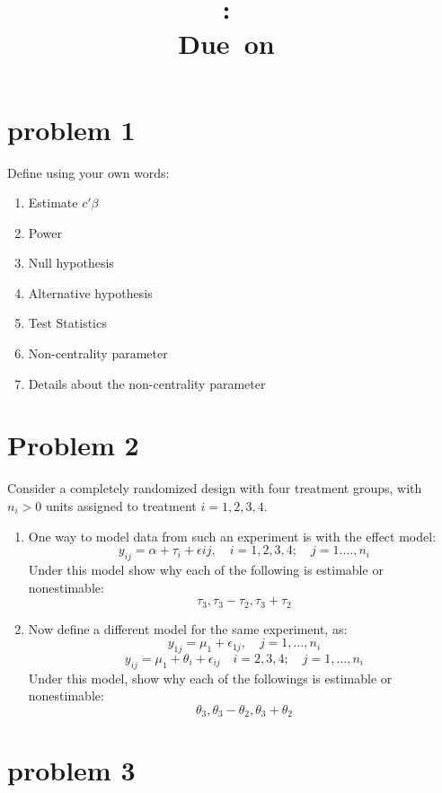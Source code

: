 \documentclass{article}
\title{
	\vspace{2in}
	\textmd{\textbf{\hmwkClass:\ \hmwkTitle}}\\
	\normalsize\vspace{0.1in}\small{Due\ on\ \hmwkDueDate}\\
	\vspace{0.1in}\large{\textit{\hmwkClassInstructor}}
	\vspace{3in}
}
\author{\hmwkAuthorName}
\date{}
\begin{document}
\maketitle
\pagebreak
\tableofcontents
\pagebreak

\section{problem 1}
Define using your own words:
\begin{enumerate}
	\item Estimate $c'\beta$
	\item Power
	\item Null hypothesis
	\item Alternative hypothesis
	\item Test Statistics
	\item Non-centrality parameter
	\item Details about the non-centrality parameter
\end{enumerate}

\section{Problem 2}
Consider a completely randomized design with four treatment groups, with $n_i>0$ units assigned to treatment $i=1,2,3,4$.
\begin{enumerate}
	\item One way to model data from such an experiment is with the effect model:
	      $$
		      y_{ij}=\alpha + \tau_i + \epsilon{ij}, \quad i=1,2,3,4; \quad j= 1.\ldots, n_i
	      $$
	      Under this model show why each of the following is estimable or nonestimable:
	      $$
		      \tau_3, \tau_3 - \tau_2, \tau_3 + \tau_2
	      $$
	\item Now define a different model for the same experiment, as:
	      $$
		      y_{1j}= \mu_1 + \epsilon_{1j}, \quad j=1,\ldots,n_i
	      $$
	      $$
		      y_{ij}= \mu_1 + \theta_i + \epsilon_{ij} \quad i=2,3,4; \quad j=1,\ldots,n_i
	      $$
	      Under this model, show why each of the followings is estimable or nonestimable:
	      $$
		      \theta_3,\theta_3-\theta_2, \theta_3 + \theta_2
	      $$
\end{enumerate}

\section{problem 3}
\end{document}

